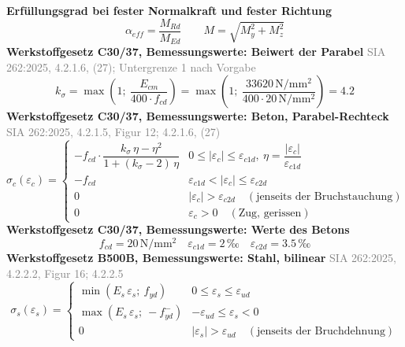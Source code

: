 \documentclass[11pt,a4paper]{article}
\newcommand{\normref}[1]{{\small\textcolor{gray}{#1}}}
\begin{document}
\noindent\textbf{Erfüllungsgrad bei fester Normalkraft und fester Richtung}
\begin{equation*}
\alpha_{eff} = \frac{M_{Rd}}{M_{Ed}} \qquad M = \sqrt{M_y^2 + M_z^2}
\end{equation*}
\noindent\textbf{Werkstoffgesetz C30/37, Bemessungswerte: Beiwert der Parabel} \hfill \normref{SIA 262:2025, 4.2.1.6, (27); Untergrenze 1 nach Vorgabe}
\begin{equation*}
k_{\sigma} = \max\left(1;\ \frac{E_{cm}}{400 \cdot f_{cd}}\right) = \max\left(1;\ \frac{33620\,\mathrm{N}/\mathrm{mm}^{2}}{400 \cdot 20\,\mathrm{N}/\mathrm{mm}^{2}}\right) = 4.2
\end{equation*}
\noindent\textbf{Werkstoffgesetz C30/37, Bemessungswerte: Beton, Parabel-Rechteck} \hfill \normref{SIA 262:2025, 4.2.1.5, Figur 12; 4.2.1.6, (27)}
\begin{equation*}
\sigma_c(\varepsilon_c) = \begin{cases} -f_{cd} \cdot \dfrac{k_\sigma\,\eta - \eta^2}{1 + (k_\sigma - 2)\,\eta} & 0 \le |\varepsilon_c| \le \varepsilon_{c1d},\ \eta = \dfrac{|\varepsilon_c|}{\varepsilon_{c1d}} \\[2ex] -f_{cd} & \varepsilon_{c1d} < |\varepsilon_c| \le \varepsilon_{c2d} \\[1ex] 0 & |\varepsilon_c| > \varepsilon_{c2d} \quad (\text{jenseits der Bruchstauchung}) \\[1ex] 0 & \varepsilon_c > 0 \quad (\text{Zug, gerissen}) \end{cases}
\end{equation*}
\noindent\textbf{Werkstoffgesetz C30/37, Bemessungswerte: Werte des Betons}
\begin{equation*}
f_{cd} = 20\,\mathrm{N}/\mathrm{mm}^{2} \quad \varepsilon_{c1d} = 2\,\text{‰} \quad \varepsilon_{c2d} = 3.5\,\text{‰}
\end{equation*}
\noindent\textbf{Werkstoffgesetz B500B, Bemessungswerte: Stahl, bilinear} \hfill \normref{SIA 262:2025, 4.2.2.2, Figur 16; 4.2.2.5}
\begin{equation*}
\sigma_s(\varepsilon_s) = \begin{cases} \min(E_s\,\varepsilon_s;\ f_{yd}) & 0 \le \varepsilon_s \le \varepsilon_{ud} \\[1ex] \max(E_s\,\varepsilon_s;\ -f_{yd}^{-}) & -\varepsilon_{ud} \le \varepsilon_s < 0 \\[1ex] 0 & |\varepsilon_s| > \varepsilon_{ud} \quad (\text{jenseits der Bruchdehnung}) \end{cases}
\end{equation*}
\end{document}
